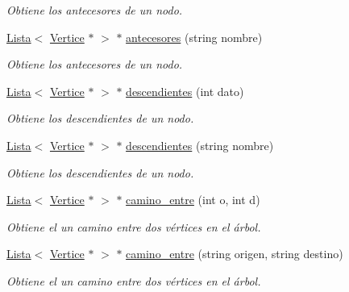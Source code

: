 \begin{DoxyCompactItemize}
\begin{DoxyCompactList}\small\item\em Obtiene los antecesores de un nodo. \end{DoxyCompactList}\item 
\hyperlink{classLista}{Lista}$<$ \hyperlink{classVertice}{Vertice} $\ast$ $>$ $\ast$ \hyperlink{classArbol_aa975d5d9cf5fcfc392a8200bd0078d1c}{antecesores} (string nombre)
\begin{DoxyCompactList}\small\item\em Obtiene los antecesores de un nodo. \end{DoxyCompactList}\item 
\hyperlink{classLista}{Lista}$<$ \hyperlink{classVertice}{Vertice} $\ast$ $>$ $\ast$ \hyperlink{classArbol_acae8e9dfd17ae18e250d9029172e1c9e}{descendientes} (int dato)
\begin{DoxyCompactList}\small\item\em Obtiene los descendientes de un nodo. \end{DoxyCompactList}\item 
\hyperlink{classLista}{Lista}$<$ \hyperlink{classVertice}{Vertice} $\ast$ $>$ $\ast$ \hyperlink{classArbol_a790b07f284b14bd179499eb4a991ad86}{descendientes} (string nombre)
\begin{DoxyCompactList}\small\item\em Obtiene los descendientes de un nodo. \end{DoxyCompactList}\item 
\hyperlink{classLista}{Lista}$<$ \hyperlink{classVertice}{Vertice} $\ast$ $>$ $\ast$ \hyperlink{classArbol_accfa606c5f5e67b6ab18c4490075cf39}{camino\+\_\+entre} (int o, int d)
\begin{DoxyCompactList}\small\item\em Obtiene el un camino entre dos vértices en el árbol. \end{DoxyCompactList}\item 
\hyperlink{classLista}{Lista}$<$ \hyperlink{classVertice}{Vertice} $\ast$ $>$ $\ast$ \hyperlink{classArbol_aef0f680828ac573af495b98d2eb09c12}{camino\+\_\+entre} (string origen, string destino)
\begin{DoxyCompactList}\small\item\em Obtiene el un camino entre dos vértices en el árbol. \end{DoxyCompactList}\end{DoxyCompactItemize}
